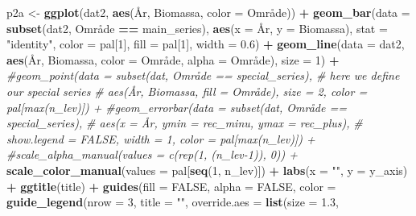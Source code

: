 \documentclass[]{article}
\newenvironment{Shaded}{\begin{snugshade}}{\end{snugshade}}
\newcommand{\KeywordTok}[1]{\textcolor[rgb]{0.13,0.29,0.53}{\textbf{#1}}}
\newcommand{\DataTypeTok}[1]{\textcolor[rgb]{0.13,0.29,0.53}{#1}}
\newcommand{\DecValTok}[1]{\textcolor[rgb]{0.00,0.00,0.81}{#1}}
\newcommand{\FloatTok}[1]{\textcolor[rgb]{0.00,0.00,0.81}{#1}}
\newcommand{\StringTok}[1]{\textcolor[rgb]{0.31,0.60,0.02}{#1}}
\newcommand{\CommentTok}[1]{\textcolor[rgb]{0.56,0.35,0.01}{\textit{#1}}}
\newcommand{\OtherTok}[1]{\textcolor[rgb]{0.56,0.35,0.01}{#1}}
\newcommand{\OperatorTok}[1]{\textcolor[rgb]{0.81,0.36,0.00}{\textbf{#1}}}
\newcommand{\NormalTok}[1]{#1}
\begin{document}
\begin{Shaded}
\begin{Highlighting}[]
\NormalTok{p2a <-}\StringTok{ }\KeywordTok{ggplot}\NormalTok{(dat2, }\KeywordTok{aes}\NormalTok{(År, Biomassa, }\DataTypeTok{color =}\NormalTok{ Område)) }\OperatorTok{+}
\StringTok{  }\KeywordTok{geom_bar}\NormalTok{(}\DataTypeTok{data =} \KeywordTok{subset}\NormalTok{(dat2, Område }\OperatorTok{==}\StringTok{ }\NormalTok{main_series), }
           \KeywordTok{aes}\NormalTok{(}\DataTypeTok{x =}\NormalTok{ År, }\DataTypeTok{y =}\NormalTok{ Biomassa), }\DataTypeTok{stat =} \StringTok{"identity"}\NormalTok{, }\DataTypeTok{color =}\NormalTok{ pal[}\DecValTok{1}\NormalTok{], }\DataTypeTok{fill =}\NormalTok{ pal[}\DecValTok{1}\NormalTok{], }
           \DataTypeTok{width =} \FloatTok{0.6}\NormalTok{) }\OperatorTok{+}
\StringTok{  }\KeywordTok{geom_line}\NormalTok{(}\DataTypeTok{data =}\NormalTok{ dat2, }\KeywordTok{aes}\NormalTok{(År, Biomassa, }\DataTypeTok{color =}\NormalTok{ Område, }\DataTypeTok{alpha =}\NormalTok{ Område), }
            \DataTypeTok{size =} \DecValTok{1}\NormalTok{) }\OperatorTok{+}\StringTok{ }
\StringTok{  }\CommentTok{#geom_point(data = subset(dat, Område == special_series), # here we define our special series}
\StringTok{  }\CommentTok{#           aes(År, Biomassa, fill = Område), size = 2, color = pal[max(n_lev)]) + }
\StringTok{  }\CommentTok{#geom_errorbar(data = subset(dat, Område == special_series), }
\StringTok{  }\CommentTok{#              aes(x = År, ymin = rec_minu, ymax = rec_plus), }
\StringTok{  }\CommentTok{#              show.legend = FALSE, width  = 1, color = pal[max(n_lev)]) +}
\StringTok{  }\CommentTok{#scale_alpha_manual(values = c(rep(1, (n_lev-1)), 0)) + }
\StringTok{  }\KeywordTok{scale_color_manual}\NormalTok{(}\DataTypeTok{values =}\NormalTok{ pal[}\KeywordTok{seq}\NormalTok{(}\DecValTok{1}\NormalTok{, n_lev)]) }\OperatorTok{+}
\StringTok{  }\KeywordTok{labs}\NormalTok{(}\DataTypeTok{x =} \StringTok{""}\NormalTok{, }\DataTypeTok{y =}\NormalTok{ y_axis) }\OperatorTok{+}
\StringTok{  }\KeywordTok{ggtitle}\NormalTok{(title) }\OperatorTok{+}
\StringTok{  }\KeywordTok{guides}\NormalTok{(}\DataTypeTok{fill  =} \OtherTok{FALSE}\NormalTok{,}
         \DataTypeTok{alpha =} \OtherTok{FALSE}\NormalTok{,}
         \DataTypeTok{color =} \KeywordTok{guide_legend}\NormalTok{(}\DataTypeTok{nrow =} \DecValTok{3}\NormalTok{, }
                              \DataTypeTok{title =} \StringTok{""}\NormalTok{,}
                              \DataTypeTok{override.aes =} \KeywordTok{list}\NormalTok{(}\DataTypeTok{size =} \FloatTok{1.3}\NormalTok{, }

\end{Highlighting}
\end{Shaded}
\end{document}
